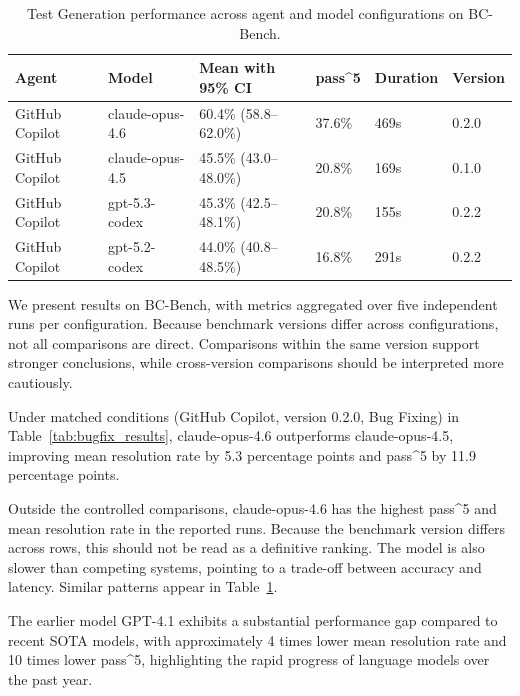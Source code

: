 \documentclass{article}
\newcommand{\passk}[1]{pass\textasciicircum #1}
\begin{document}
\begin{table}[t]
\vskip 0.05in
\begin{center}
\begin{small}
\begin{sc}
\begin{tabular}{llllll}
\toprule
\textbf{Agent} & \textbf{Model} & \textbf{Mean with 95\% CI} & \textbf{\passk{5}} & \textbf{Duration} & \textbf{Version} \\
\midrule
GitHub Copilot & claude-opus-4.6 & 60.4\% (58.8--62.0\%) & 37.6\% & 469s & 0.2.0 \\
GitHub Copilot & claude-opus-4.5 & 45.5\% (43.0--48.0\%) & 20.8\% & 169s & 0.1.0 \\
GitHub Copilot & gpt-5.3-codex & 45.3\% (42.5--48.1\%) & 20.8\% & 155s & 0.2.2 \\
GitHub Copilot & gpt-5.2-codex & 44.0\% (40.8--48.5\%) & 16.8\% & 291s & 0.2.2 \\
\bottomrule
\end{tabular}
\end{sc}
\end{small}
\end{center}
\caption{Test Generation performance across agent and model configurations on BC-Bench.}
\label{tab:test_generation_results}
\vskip 0.1in
\end{table}

We present results on BC-Bench, with metrics aggregated over five independent runs per configuration. Because benchmark versions differ across configurations, not all comparisons are direct. Comparisons within the same version support stronger conclusions, while cross-version comparisons should be interpreted more cautiously.

Under matched conditions (GitHub Copilot, version 0.2.0, Bug Fixing) in Table~\ref{tab:bugfix_results}, claude-opus-4.6 outperforms claude-opus-4.5, improving mean resolution rate by 5.3 percentage points and \passk{5} by 11.9 percentage points.

Outside the controlled comparisons, claude-opus-4.6 has the highest \passk{5} and mean resolution rate in the reported runs. Because the benchmark version differs across rows, this should not be read as a definitive ranking. The model is also slower than competing systems, pointing to a trade-off between accuracy and latency. Similar patterns appear in Table~\ref{tab:test_generation_results}.

The earlier model GPT-4.1 exhibits a substantial performance gap compared to recent SOTA models, with approximately 4 times lower mean resolution rate and 10 times lower \passk{5}, highlighting the rapid progress of language models over the past year.
\end{document}
